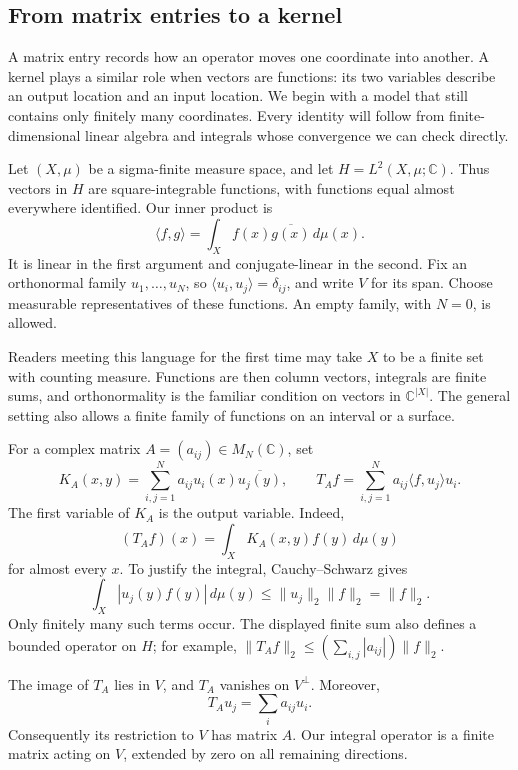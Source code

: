 \subsection{From matrix entries to a kernel}\label{finite-kernel-model}

A matrix entry records how an operator moves one coordinate into another. A kernel plays a similar role when vectors are functions: its two variables describe an output location and an input location. We begin with a model that still contains only finitely many coordinates. Every identity will follow from finite-dimensional linear algebra and integrals whose convergence we can check directly.

Let \((X,\mu)\) be a sigma-finite measure space, and let \(H=L^2(X,\mu;\mathbb C)\). Thus vectors in \(H\) are square-integrable functions, with functions equal almost everywhere identified. Our inner product is
\[
\langle f,g\rangle=\int_X f(x)\overline{g(x)}\,d\mu(x).
\]
It is linear in the first argument and conjugate-linear in the second. Fix an orthonormal family \(u_1,\ldots,u_N\), so \(\langle u_i,u_j\rangle=\delta_{ij}\), and write \(V\) for its span. Choose measurable representatives of these functions. An empty family, with \(N=0\), is allowed.

Readers meeting this language for the first time may take \(X\) to be a finite set with counting measure. Functions are then column vectors, integrals are finite sums, and orthonormality is the familiar condition on vectors in \(\mathbb C^{|X|}\). The general setting also allows a finite family of functions on an interval or a surface.

For a complex matrix \(A=(a_{ij})\in M_N(\mathbb C)\), set
\[
K_A(x,y)=\sum_{i,j=1}^N a_{ij}u_i(x)\overline{u_j(y)},
\qquad
T_Af=\sum_{i,j=1}^N a_{ij}\langle f,u_j\rangle u_i.
\]
The first variable of \(K_A\) is the output variable. Indeed,
\[
(T_Af)(x)=\int_X K_A(x,y)f(y)\,d\mu(y)
\]
for almost every \(x\). To justify the integral, Cauchy--Schwarz gives
\[
\int_X |u_j(y)f(y)|\,d\mu(y)\leq\|u_j\|_2\|f\|_2=\|f\|_2.
\]
Only finitely many such terms occur. The displayed finite sum also defines a bounded operator on \(H\); for example,
\(\|T_Af\|_2\leq(\sum_{i,j}|a_{ij}|)\|f\|_2\).

The image of \(T_A\) lies in \(V\), and \(T_A\) vanishes on \(V^\perp\). Moreover,
\[
T_Au_j=\sum_i a_{ij}u_i.
\]
Consequently its restriction to \(V\) has matrix \(A\). Our integral operator is a finite matrix acting on \(V\), extended by zero on all remaining directions.

